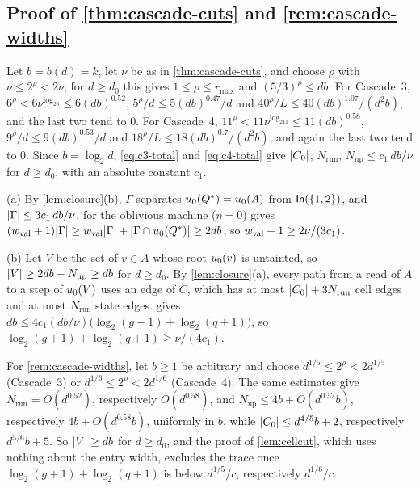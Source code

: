 \subsection{Proof of \texorpdfstring{\cref{thm:cascade-cuts}}{the theorem} and \texorpdfstring{\cref{rem:cascade-widths}}{the remark}}

Let $b=b(d)=k$, let $\nu$ be as in \cref{thm:cascade-cuts}, and choose $\rho$ with $\nu\le2^\rho<2\nu$; for $d\ge d_0$ this gives
$1\le\rho\le r_{\max}$ and $(5/3)^\rho\le db$. For Cascade~3, $6^\rho<6\nu^{\log_26}\le6(db)^{0.52}$,
$5^\rho/d\le5(db)^{0.47}/d$ and $40^\rho/L\le40(db)^{1.07}/(d^2b)$, and the last two tend to $0$. For Cascade~4,
$11^\rho<11\nu^{\log_211}\le11(db)^{0.58}$, $9^\rho/d\le9(db)^{0.53}/d$ and $18^\rho/L\le18(db)^{0.7}/(d^2b)$, and again the last two
tend to $0$. Since $b=\log_2d$, \eqref{eq:c3-total} and \eqref{eq:c4-total} give $\lvert C_0 \rvert$, $N_{\mathrm{run}}$, $N_{\mathrm{up}}\le c_1\,db/\nu$
for $d\ge d_0$, with an absolute constant $c_1$.

(a) By \cref{lem:closure}(b), $\Gamma$ separates $u_0(Q^{*})=u_0(A)$ from $\mathsf{In}(\{1,2\})$, and $\lvert \Gamma \rvert\le3c_1\,db/\nu$. 
for the oblivious machine ($\eta=0$) gives $(w_{\mathrm{val}}+1)\lvert \Gamma \rvert\ge w_{\mathrm{val}}\lvert \Gamma \rvert+\lvert \Gamma\cap u_0(Q^{*}) \rvert\ge2db$, so
$w_{\mathrm{val}}+1\ge2\nu/(3c_1)$.

(b) Let $V$ be the set of $v\in A$ whose root $u_0(v)$ is untainted, so $\lvert V \rvert\ge2db-N_{\mathrm{up}}\ge db$ for $d\ge d_0$. By
\cref{lem:closure}(a), every path from a read of $A$ to a step of $u_0(V)$ uses an edge of $C$, which has at most $\lvert C_0 \rvert+3N_{\mathrm{run}}$
cell edges and at most $N_{\mathrm{run}}$ state edges.  gives
$db\le4c_1(db/\nu)\bigl(\log_2(g+1)+\log_2(q+1)\bigr)$, so $\log_2(g+1)+\log_2(q+1)\ge\nu/(4c_1)$.

For \cref{rem:cascade-widths}, let $b\ge1$ be arbitrary and choose $d^{1/5}\le2^\rho<2d^{1/5}$ (Cascade~3) or $d^{1/6}\le2^\rho<2d^{1/6}$
(Cascade~4). The same estimates give $N_{\mathrm{run}}=O(d^{0.52})$, respectively $O(d^{0.58})$, and $N_{\mathrm{up}}\le4b+O(d^{0.52}b)$,
respectively $4b+O(d^{0.58}b)$, uniformly in $b$, while $\lvert C_0 \rvert\le d^{4/5}b+2$, respectively $d^{5/6}b+5$. So $\lvert V \rvert\ge db$ for $d\ge d_0$,
and the proof of \cref{lem:cellcut}, which uses nothing about the entry width, excludes the trace once $\log_2(g+1)+\log_2(q+1)$ is below
$d^{1/5}/c$, respectively $d^{1/6}/c$.
